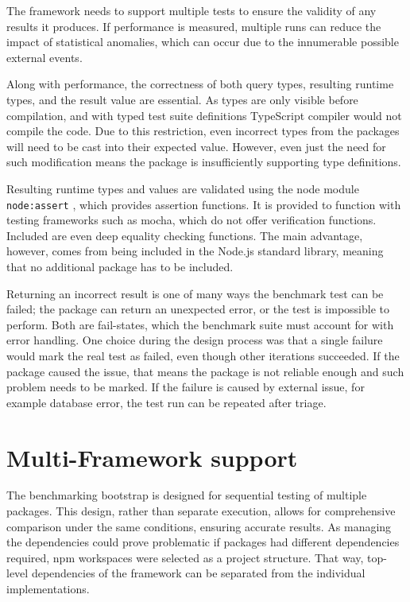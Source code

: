 The framework needs to support multiple tests to ensure the validity of any
results it produces. If performance is measured, multiple runs can reduce the
impact of statistical anomalies, which can occur due to the innumerable possible
external events.

Along with performance, the correctness of both query types, resulting runtime
types, and the result value are essential. As types are only visible before
compilation, and with typed test suite definitions TypeScript compiler would not
compile the code. Due to this restriction, even incorrect types from the
packages will need to be cast into their expected value. However, even just the
need for such modification means the package is insufficiently supporting type
definitions.

Resulting runtime types and values are validated using the node module
\texttt{node:assert} \cite{NodeAssert}, which provides assertion functions. It
is provided to function with testing frameworks such as mocha, which do not
offer verification functions. Included are even deep equality checking
functions. The main advantage, however, comes from being included in the Node.js
standard library, meaning that no additional package has to be included.

Returning an incorrect result is one of many ways the benchmark test can be
failed; the package can return an unexpected error, or the test is impossible to
perform. Both are fail-states, which the benchmark suite must account for with
error handling. One choice during the design process was that a single failure
would mark the real test as failed, even though other iterations succeeded. If
the package caused the issue, that means the package is not reliable enough and
such problem needs to be marked. If the failure is caused by external issue, for
example database error, the test run can be repeated after triage.

\section{Multi-Framework support}

The benchmarking bootstrap is designed for sequential testing of multiple
packages. This design, rather than separate execution, allows for comprehensive
comparison under the same conditions, ensuring accurate results. As managing the
dependencies could prove problematic if packages had different dependencies
required, npm workspaces \cite{npmWorkspaces} were selected as a project
structure. That way, top-level dependencies of the framework can be separated
from the individual implementations.

